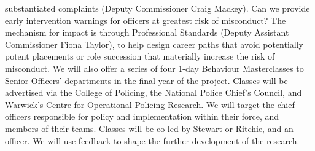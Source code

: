 substantiated complaints (Deputy Commissioner Craig Mackey). Can we provide early
intervention warnings for officers at greatest risk of misconduct? The mechanism for impact
is through Professional Standards (Deputy Assistant Commissioner Fiona Taylor), to help
design career paths that avoid potentially potent placements or role succession that
materially increase the risk of misconduct.
We will also offer a series of four 1-day Behaviour Masterclasses to Senior Officers'
departments in the final year of the project. Classes will be advertised via the College of
Policing, the National Police Chief’s Council, and Warwick’s Centre for Operational Policing
Research. We will target the chief officers responsible for policy and implementation within
their force, and members of their teams. Classes will be co-led by Stewart or Ritchie, and an
officer. We will use feedback to shape the further development of the research.


